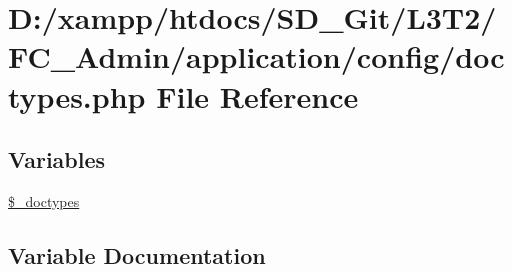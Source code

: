 \hypertarget{_admin_2application_2config_2doctypes_8php}{}\section{D\+:/xampp/htdocs/\+S\+D\+\_\+\+Git/\+L3\+T2/\+F\+C\+\_\+\+Admin/application/config/doctypes.php File Reference}
\label{_admin_2application_2config_2doctypes_8php}
\subsection*{Variables}
\begin{DoxyCompactItemize}
\item 
\hyperlink{_admin_2application_2config_2doctypes_8php_aae4e5521057605d22a78c29c7d4ad7de}{\$\+\_\+doctypes}
\end{DoxyCompactItemize}


\subsection{Variable Documentation}
\hypertarget{_admin_2application_2config_2doctypes_8php_aae4e5521057605d22a78c29c7d4ad7de}{}

